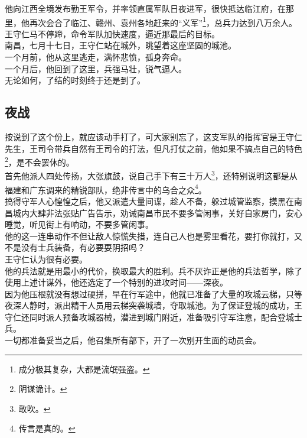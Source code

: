 \begin{multicols}{\theparacolNo}
他向江西全境发布勤王军令，并率领直属军队日夜进军，很快抵达临江府，在那里，他再次会合了临江、赣州、袁州各地赶来的“义军”\footnote{成分极其复杂，大都是流氓强盗。}，总兵力达到八万余人。王守仁马不停蹄，命令军队加快速度，逼近那最后的目标。\\

南昌，七月十七日，王守仁站在城外，眺望着这座坚固的城池。\\

一个月前，他从这里逃走，满怀悲愤，孤身奔命。\\

一个月后，他回到了这里，兵强马壮，锐气逼人。\\

无论如何，了结的时刻终于还是到了。\\

\subsection{夜战}
按说到了这个份上，就应该动手打了，可大家别忘了，这支军队的指挥官是王守仁先生，王司令带兵自然有王司令的打法，但凡打仗之前，他如果不搞点自己的特色\footnote{阴谋诡计。}，是不会罢休的。\\

首先他派人四处传扬，大张旗鼓，说自己手下有三十万人\footnote{敢吹。}，还特别说明这都是从福建和广东调来的精锐部队，绝非传言中的乌合之众\footnote{传言是真的。}。\\

搞得守军人心惶惶之后，他又派遣大量间谍，趁人不备，躲过城管监察，摸黑在南昌城内大肆非法张贴广告告示，劝诫南昌市民不要多管闲事，关好自家房门，安心睡觉，听见街上有响动，不要多管闲事。\\

他的这一连串动作不但让敌人惊慌失措，连自己人也是雾里看花，要打你就打，又不是没有士兵装备，有必要耍阴招吗？\\

王守仁认为很有必要。\\

他的兵法就是用最小的代价，换取最大的胜利。兵不厌诈正是他的兵法哲学，除了使用上述计谋外，他还选定了一个特别的进攻时间——深夜。\\

因为他压根就没有想过硬拼，早在行军途中，他就已准备了大量的攻城云梯，只等夜深人静时，派出精干人员用云梯突袭城墙，夺取城池。为了保证登城的成功，王守仁还同时派人预备攻城器械，潜进到城门附近，准备吸引守军注意，配合登城士兵。\\

一切都准备妥当之后，他召集所有部下，开了一次别开生面的动员会。\\


\end{multicols}
